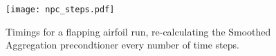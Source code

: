 \begin{itemize}
\begin{figure}[h]
\centering
	\texttt{[image: npc\_steps.pdf]}
	\caption{\small Timings for a flapping airfoil run, re-calculating the Smoothed Aggregation precondtioner every number of time steps.}
	\label{fig:npc_steps}
\end{figure}

\end{itemize}
